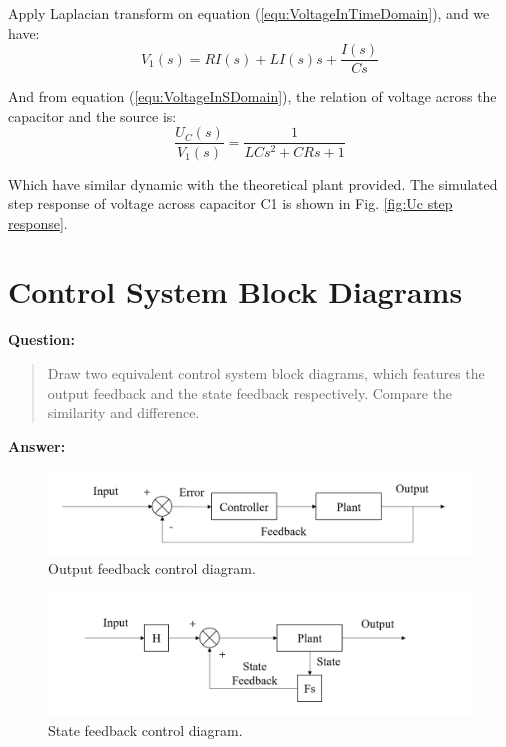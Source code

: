 \documentclass[12pt, oneside]{article}
\begin{document}
Apply Laplacian transform on equation (\ref{equ:VoltageInTimeDomain}), and we have:
\begin{equation}
        V_1(s) = RI(s)+ LI(s)s+\frac{I(s)}{Cs}
        \label{equ:VoltageInSDomain}
\end{equation}

And from equation (\ref{equ:VoltageInSDomain}), the relation of voltage across the capacitor and the source is:
\begin{equation}
    \frac{U_C(s)}{V_1(s)}=\frac{1}{LCs^2+CRs+1}
\end{equation}

Which have similar dynamic with the theoretical plant provided. The simulated step response of voltage across capacitor C1 is shown in Fig. \ref{fig:Uc step response}.

\pagebreak

\section{Control System Block Diagrams}
\textbf{Question:}
\begin{quote}
    Draw two equivalent control system block diagrams, which features the output feedback and the state feedback respectively. Compare the similarity and difference. 
\end{quote}
\textbf{Answer:}

\begin{figure}[htbp]
    \centering
    \includegraphics[height = 0.07\paperheight]{Report/pics/OutputFeedbackDiagram.png}
    \caption{Output feedback control diagram.}
    \label{fig:my_label}
\end{figure}

\begin{figure}[htbp]
    \centering
    \includegraphics[height = 0.1\paperheight]{Report/pics/StateFeedbackDiagram.png}
    \caption{State feedback control diagram.}
    \label{fig:my_label}
\end{figure}
\end{document}
